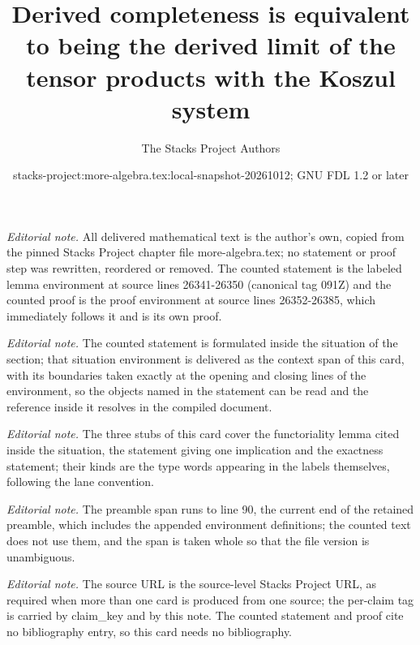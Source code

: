 \documentclass[10pt,a4paper]{amsart}
\title{Derived completeness is equivalent to being the derived limit of the tensor products with the Koszul system}
\author{The Stacks Project Authors}
\date{stacks-project:more-algebra.tex:local-snapshot-20261012; GNU FDL 1.2 or later}
\theoremstyle{plain}
\theoremstyle{definition}
\theoremstyle{remark}
\numberwithin{equation}{subsection}
\begin{document}
\maketitle
\setcounter{subsection}{1}
\noindent\textit{Editorial note.} All delivered mathematical text is the author's own, copied from the pinned Stacks Project chapter file more-algebra.tex; no statement or proof step was rewritten, reordered or removed. The counted statement is the labeled lemma environment at source lines 26341-26350 (canonical tag 091Z) and the counted proof is the proof environment at source lines 26352-26385, which immediately follows it and is its own proof.\par\medskip
\noindent\textit{Editorial note.} The counted statement is formulated inside the situation of the section; that situation environment is delivered as the context span of this card, with its boundaries taken exactly at the opening and closing lines of the environment, so the objects named in the statement can be read and the reference inside it resolves in the compiled document.\par\medskip
\noindent\textit{Editorial note.} The three stubs of this card cover the functoriality lemma cited inside the situation, the statement giving one implication and the exactness statement; their kinds are the type words appearing in the labels themselves, following the lane convention.\par\medskip
\noindent\textit{Editorial note.} The preamble span runs to line 90, the current end of the retained preamble, which includes the appended environment definitions; the counted text does not use them, and the span is taken whole so that the file version is unambiguous.\par\medskip
\noindent\textit{Editorial note.} The source URL is the source-level Stacks Project URL, as required when more than one card is produced from one source; the per-claim tag is carried by claim\_key and by this note. The counted statement and proof cite no bibliography entry, so this card needs no bibliography.\par\medskip
\end{document}
